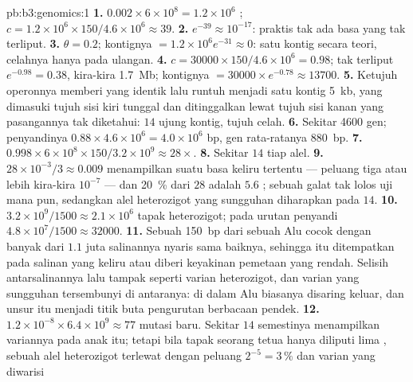 \begin{solution}{pb:b3:genomics:1}
\textbf{1.} $0.002\times 6\times 10^{8} = 1.2\times 10^{6}$ ;
$c = 1.2\times 10^{6}\times 150/4.6\times 10^{6} \approx 39$.
\textbf{2.} $e^{-39} \approx 10^{-17}$: praktis tak ada basa yang tak
terliput.
\textbf{3.} $\theta = 0.2$; kontignya $= 1.2\times 10^{6} e^{-31} \approx
0$: satu kontig secara teori, celahnya hanya pada ulangan.
\textbf{4.} $c = \num{30000}\times 150/4.6\times 10^{6} = 0.98$;
tak terliput $e^{-0.98} = 0.38$, kira-kira \qty{1.7}{Mb}; kontignya $= \num{30000}
\times e^{-0.78} \approx \num{13700}$.
\textbf{5.} Ketujuh operonnya memberi  yang identik lalu runtuh menjadi
satu kontig \qty{5}{kb}, yang dimasuki tujuh sisi kiri tunggal dan
ditinggalkan lewat tujuh sisi kanan yang pasangannya tak diketahui: $14$
ujung kontig, tujuh celah.
\textbf{6.} Sekitar \num{4600} gen; penyandinya $0.88\times 4.6\times 10^{6}
= 4.0\times 10^{6}$ bp, gen rata-ratanya \qty{880}{bp}.
\textbf{7.} $0.998\times 6\times 10^{8}\times 150/3.2\times 10^{9}
\approx 28\times$.
\textbf{8.} Sekitar $14$  tiap alel.
\textbf{9.} $28\times 10^{-3}/3 \approx 0.009$  menampilkan suatu
basa keliru tertentu --- peluang tiga atau lebih kira-kira $10^{-7}$ --- dan
\qty{20}{\%} dari $28$ adalah $5.6$ ; sebuah galat tak lolos uji
mana pun, sedangkan alel heterozigot yang sungguhan diharapkan pada $14$.
\textbf{10.} $3.2\times 10^{9}/1500 \approx 2.1\times 10^{6}$
tapak heterozigot; pada urutan penyandi $4.8\times 10^{7}/1500 \approx
\num{32000}$.
\textbf{11.} Sebuah  \qty{150}{bp} dari sebuah Alu cocok dengan banyak
dari $1.1$ juta salinannya nyaris sama baiknya, sehingga  itu
ditempatkan pada salinan yang keliru atau diberi keyakinan pemetaan yang
rendah. Selisih antarsalinannya lalu tampak seperti varian heterozigot, dan
varian yang sungguhan tersembunyi di antaranya:  di dalam
Alu biasanya disaring keluar, dan unsur itu menjadi titik buta pengurutan
berbacaan pendek.
\textbf{12.} $1.2\times 10^{-8}\times 6.4\times 10^{9} \approx 77$ mutasi
baru. Sekitar $14$  semestinya menampilkan variannya pada anak itu;
tetapi bila tapak seorang tetua hanya diliputi lima , sebuah alel
heterozigot terlewat dengan peluang $2^{-5} = 3\,\%$ dan varian yang diwarisi

\end{solution}

